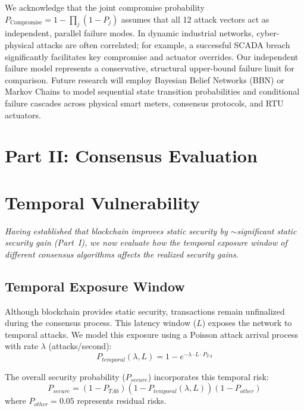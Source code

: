 \documentclass[10pt,twocolumn,journal]{IEEEtran}
\begin{document}
We acknowledge that the joint compromise probability $P_{\mathrm{Compromise}} = 1 - \prod_{j} (1 - P_j)$ assumes that all 12 attack vectors act as independent, parallel failure modes. In dynamic industrial networks, cyber-physical attacks are often correlated; for example, a successful SCADA breach significantly facilitates key compromise and actuator overrides. Our independent failure model represents a conservative, structural upper-bound failure limit for comparison. Future research will employ Bayesian Belief Networks (BBN) or Markov Chains to model sequential state transition probabilities and conditional failure cascades across physical smart meters, consensus protocols, and RTU actuators.

\section*{Part II: Consensus Evaluation}
\section{Temporal Vulnerability}
\label{sec:temporal_benchmarking}

\emph{Having established that blockchain improves static security by $\sim$significant static security gain (Part~I), we now evaluate how the temporal exposure window of different consensus algorithms affects the realized security gains.}

\subsection{Temporal Exposure Window}

Although blockchain provides static security, transactions remain unfinalized during the consensus process. This latency window ($L$) exposes the network to temporal attacks. We model this exposure using a Poisson attack arrival process with rate $\lambda$ (attacks/second):
\begin{equation}
P_{temporal}(\lambda, L) = 1 - e^{-\lambda \cdot L \cdot P_{TA}}
\end{equation}

The overall security probability ($P_{secure}$) incorporates this temporal risk:
\begin{equation}
P_{secure} = (1 - P_{TAb})(1 - P_{temporal}(\lambda, L))(1 - P_{other})
\end{equation}
where $P_{other} = 0.05$ represents residual risks.
\end{document}
